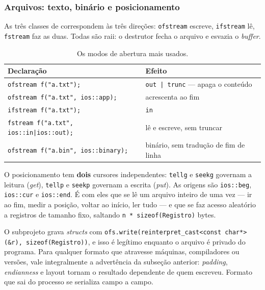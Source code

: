 \subsubsection{Arquivos: texto, binário e posicionamento}

As três classes de  correspondem às três direções:
\texttt{ofstream} escreve, \texttt{ifstream} lê, \texttt{fstream} faz as duas.
Todas são \gls{raii}: o destrutor fecha o arquivo e esvazia o \emph{buffer}.

\begin{table}[htbp]
\centering
\caption{Os modos de abertura mais usados.}
\label{tab:modos-abertura}
\footnotesize
\begin{tabular}{@{}ll@{}}
\toprule
\textbf{Declaração} & \textbf{Efeito} \\
\midrule
\texttt{ofstream f("a.txt");}                 & \texttt{out | trunc} --- apaga o conteúdo \\
\texttt{ofstream f("a.txt", ios::app);}       & acrescenta ao fim \\
\texttt{ifstream f("a.txt");}                 & \texttt{in} \\
\texttt{fstream f("a.txt", ios::in|ios::out);}& lê e escreve, sem truncar \\
\texttt{ofstream f("a.bin", ios::binary);}    & binário, sem tradução de fim de linha \\
\bottomrule
\end{tabular}
\end{table}

O posicionamento tem \textbf{dois} cursores independentes: \texttt{tellg} e
\texttt{seekg} governam a leitura (\emph{get}), \texttt{tellp} e \texttt{seekp}
governam a escrita (\emph{put}). As origens são \texttt{ios::beg},
\texttt{ios::cur} e \texttt{ios::end}. É com eles que se lê um arquivo inteiro
de uma vez --- ir ao fim, medir a posição, voltar ao início, ler tudo --- e que
se faz acesso aleatório a registros de tamanho fixo, saltando
\texttt{n * sizeof(Registro)} bytes.

\begin{armadilha}
O subprojeto grava \emph{structs} com \texttt{ofs.write(reinterpret\_cast<const
char*>(\&r), sizeof(Registro))}, e isso é legítimo enquanto o arquivo é privado
do programa. Para qualquer formato que atravesse máquinas, compiladores ou
versões, vale integralmente a advertência da subseção anterior: \emph{padding},
\emph{endianness} e layout tornam o resultado dependente de quem escreveu.
Formato que sai do processo se serializa campo a campo.
\end{armadilha}

